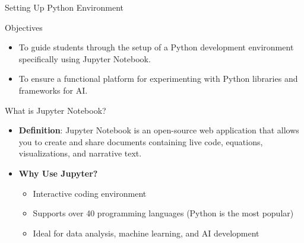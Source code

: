 \documentclass[aspectratio=169]{beamer}
\begin{document}
\begin{frame}{Setting Up Python Environment}
    \begin{block}{Objectives}
        \begin{itemize}
            \item To guide students through the setup of a Python development environment specifically using Jupyter Notebook.
            \item To ensure a functional platform for experimenting with Python libraries and frameworks for AI.
        \end{itemize}
    \end{block}
\end{frame}

\begin{frame}{What is Jupyter Notebook?}
    \begin{itemize}
        \item \textbf{Definition}: Jupyter Notebook is an open-source web application that allows you to create and share documents containing live code, equations, visualizations, and narrative text.
        \item \textbf{Why Use Jupyter?} 
        \begin{itemize}
            \item Interactive coding environment
            \item Supports over 40 programming languages (Python is the most popular)
            \item Ideal for data analysis, machine learning, and AI development
        \end{itemize}
    \end{itemize}
\end{frame}
\end{document}
